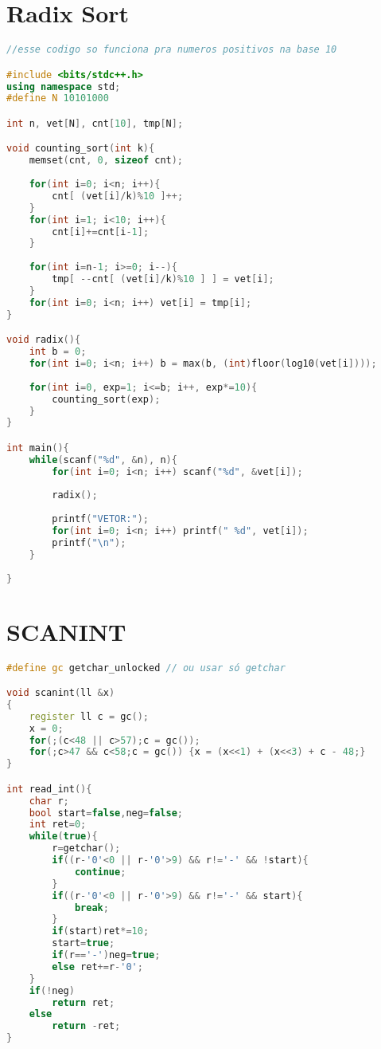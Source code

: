 \documentclass[12pt,a4paper,twoside]{report}
\begin{document}
\section{Radix Sort}
\noindent\begin{lstlisting}[caption=Radix Sort,language=C++]
//esse codigo so funciona pra numeros positivos na base 10

#include <bits/stdc++.h>
using namespace std;
#define N 10101000

int n, vet[N], cnt[10], tmp[N];

void counting_sort(int k){
    memset(cnt, 0, sizeof cnt);
    
    for(int i=0; i<n; i++){
        cnt[ (vet[i]/k)%10 ]++;
    }
    for(int i=1; i<10; i++){
        cnt[i]+=cnt[i-1];
    }
    
    for(int i=n-1; i>=0; i--){
        tmp[ --cnt[ (vet[i]/k)%10 ] ] = vet[i];
    }
    for(int i=0; i<n; i++) vet[i] = tmp[i];
}

void radix(){
    int b = 0;
    for(int i=0; i<n; i++) b = max(b, (int)floor(log10(vet[i])));
    
    for(int i=0, exp=1; i<=b; i++, exp*=10){
        counting_sort(exp);
    }
}

int main(){
    while(scanf("%d", &n), n){
        for(int i=0; i<n; i++) scanf("%d", &vet[i]);
        
        radix();
        
        printf("VETOR:");
        for(int i=0; i<n; i++) printf(" %d", vet[i]);
        printf("\n");
    }
    
}
\end{lstlisting}

\section{SCANINT}
\noindent\begin{lstlisting}[caption=Scanint,language=C++]
#define gc getchar_unlocked // ou usar só getchar

void scanint(ll &x)
{
    register ll c = gc();
    x = 0;
    for(;(c<48 || c>57);c = gc());
    for(;c>47 && c<58;c = gc()) {x = (x<<1) + (x<<3) + c - 48;}
}

int read_int(){
    char r;
    bool start=false,neg=false;
    int ret=0;
    while(true){
        r=getchar();
        if((r-'0'<0 || r-'0'>9) && r!='-' && !start){
            continue;
        }
        if((r-'0'<0 || r-'0'>9) && r!='-' && start){
            break;
        }
        if(start)ret*=10;
        start=true;
        if(r=='-')neg=true;
        else ret+=r-'0';
    }
    if(!neg)
        return ret;
    else
        return -ret;
}
\end{lstlisting}
\end{document}
